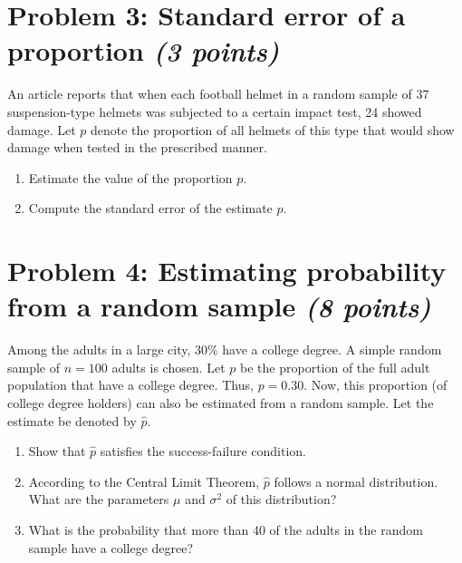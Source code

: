 \documentclass[11pt,twoside]{article}
\newcommand{\pts}[1]{\marginpar{ \small\hspace{0pt} \textit{[#1]} } }
\numberwithin{equation}{section}
\newcommand{\?}{\stackrel{?}{=}}
\begin{document}
\eject

\section*{Problem 3: Standard error of a proportion  \textit{(3 points)}}
An article reports that when each football helmet in a random sample of 37 suspension-type helmets was subjected to a
certain impact test, 24 showed damage. Let $p$ denote the proportion of all helmets of this type that would show damage
when tested in the prescribed manner.

\begin{enumerate}[\bf (a)]
\item  Estimate the value of the proportion $p$. \pts{1}
  \vspace{30ex}
 
\item Compute the standard error of the estimate $\hat p$.\pts{2}
 \end{enumerate}

\eject

\section*{Problem 4: Estimating probability from a random sample \textit{(8 points)}}
Among the adults in a large city, 30\% have a college degree. A simple random sample of $n=100$ adults is chosen.
Let $p$ be the proportion of the full adult population that have a college degree. Thus, $p = 0.30$. Now, this proportion
  (of college degree holders) can also be estimated from a random sample. Let the estimate be denoted by $\hat
  p$.

  \begin{enumerate}[\bf (a)]
  \item Show that $\hat p$ satisfies the success-failure condition. \pts{2}
       \vspace{20ex}

       
\item  According \pts{3} to the Central Limit Theorem, $\hat p$ follows a normal distribution. What are the parameters $\mu$ and
  $\sigma^{2}$ of this distribution? %

   \vspace{40ex}


  
\item What is the \pts{3} probability that more than 40 of the adults in the random sample have a college degree?

 
\end{enumerate}
\end{document}
